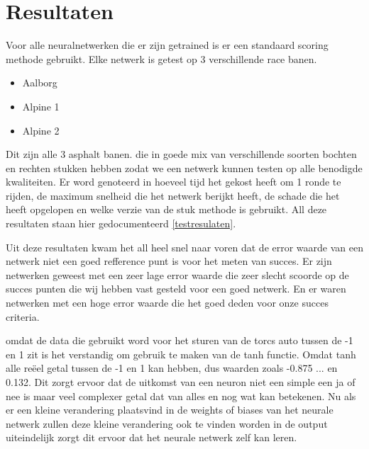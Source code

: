 \documentclass{article}
\begin{document}
\section{Resultaten}

Voor alle neuralnetwerken die er zijn getrained is er een standaard scoring methode gebruikt. Elke netwerk is getest op 3 verschillende race banen.
\begin{itemize}
\item Aalborg
\item Alpine 1
\item Alpine 2
\end{itemize}
Dit zijn alle 3 asphalt banen. die in goede mix van verschillende soorten bochten en rechten stukken hebben zodat we een netwerk kunnen testen op alle benodigde kwaliteiten. Er word genoteerd in hoeveel tijd het gekost heeft om 1 ronde te rijden, de maximum snelheid die het netwerk berijkt heeft, de schade die het heeft opgelopen en welke verzie van de stuk methode is gebruikt. All deze resultaten staan hier gedocumenteerd \ref{testresulaten}.

Uit deze resultaten kwam het all heel snel naar voren dat de error waarde van een netwerk niet een goed refference punt is voor het meten van succes. Er zijn netwerken geweest met een zeer lage error waarde die zeer slecht scoorde op de succes punten die wij hebben vast gesteld voor een goed netwerk. En er waren netwerken met een hoge error waarde die het goed deden voor onze succes criteria.

omdat de data die gebruikt word voor het sturen van de torcs auto tussen de -1 en 1 zit is het verstandig om gebruik te maken van de tanh functie. Omdat tanh alle reëel getal tussen de -1 en 1 kan hebben, dus waarden zoals -0.875 ... en 0.132. Dit zorgt ervoor dat de uitkomst van een neuron niet een simple een ja of nee is maar veel complexer getal dat van alles en nog wat kan betekenen. Nu als er een kleine verandering plaatsvind in de weights of biases van het neurale netwerk zullen deze kleine verandering ook te vinden worden in de output uiteindelijk zorgt dit ervoor dat het neurale netwerk zelf kan leren.\\\\
\end{document}
